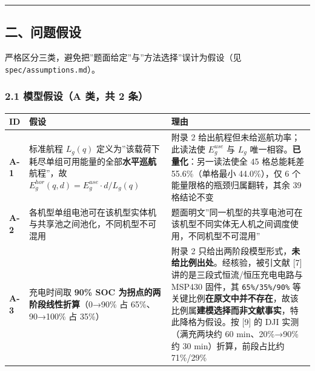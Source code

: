 \documentclass[
  10.5pt,
]{extarticle}
\newcounter{none} %
\begin{document}
\begin{center}\rule{0.5\linewidth}{0.5pt}\end{center}

\subsection{二、问题假设}\label{ux4e8cux95eeux9898ux5047ux8bbe}

严格区分三类，避免把''题面给定''与''方法选择''误计为假设（见
\texttt{spec/assumptions.md}）。

\subsubsection{2.1 模型假设（A 类，共 2
条）}\label{ux6a21ux578bux5047ux8bbea-ux7c7bux5171-2-ux6761}

{\def\LTcaptype{none} %
\begin{longtable}[]{@{}
  >{\raggedright\arraybackslash}p{}
  >{\raggedright\arraybackslash}p{}
  >{\raggedright\arraybackslash}p{}@{}}
\toprule\noalign{}
\begin{minipage}[b]{\linewidth}\raggedright
ID
\end{minipage} & \begin{minipage}[b]{\linewidth}\raggedright
假设
\end{minipage} & \begin{minipage}[b]{\linewidth}\raggedright
理由
\end{minipage} \\
\midrule\noalign{}
\endhead
\bottomrule\noalign{}
\endlastfoot
\textbf{A-1} & 标准航程 \(L_g(q)\)
定义为''该载荷下耗尽单组可用能量的全部\textbf{水平巡航}航程''，故
\(E^{hor}_g(q,d)=E^{use}_g\cdot d/L_g(q)\) & 附录 2
给出航程但未给巡航功率；此读法使 \(E^{use}_g\) 与 \(L_g\)
唯一相容。\textbf{已量化}：另一读法使全 45 格总能耗差 55.6\%（单格最小
44.0\%），仅 6 个能量限格的瓶颈归属翻转，其余 39 格结论不变 \\
\textbf{A-2} &
各机型单组电池可在该机型实体机与共享池之间池化，不同机型不可混用 &
题面明文''同一机型的共享电池可在该机型不同实体无人机之间调度使用，不同机型不可混用'' \\
\textbf{A-3} & 充电时间取 \textbf{90\% SOC
为拐点的两阶段线性折算}（0→90\% 占 65\%、90→100\% 占 35\%） & 附录 2
只给出两阶段模型形式，\textbf{未给比例出处}。经核验，被引文献 {[}7{]}
讲的是三段式恒流/恒压充电电路与 MSP430 固件，其 \texttt{65\%/35\%/90\%}
等关键比例\textbf{在原文中并不存在}，故该比例属\textbf{建模选择而非文献事实}，特此降格为假设。按
{[}9{]} 的 DJI 实测（满充两块约 60 min、20\%→90\% 约 30
min）折算，前段占比约 71\%/29\% \\
\end{longtable}
}
\end{document}
